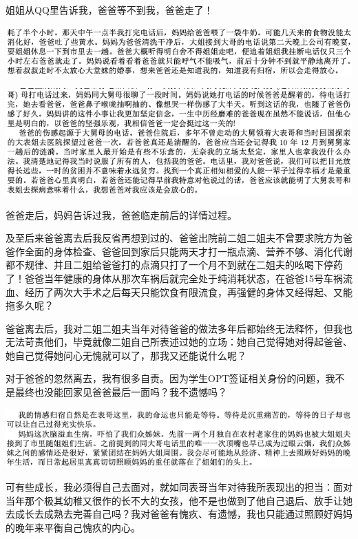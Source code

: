 \documentclass[9pt, b5paper]{article}
\begin{document}
姐姐从QQ里告诉我，爸爸等不到我，爸爸走了！

\begin{center}
\includegraphics[width=.9\linewidth]{./pic/backups_plans_20210415_103141.png}
\end{center}

\begin{center}
\includegraphics[width=.9\linewidth]{./pic/backups_plans_20210415_131810.png}
\end{center}

爸爸走后，妈妈告诉过我，爸爸临走前后的详情过程。

及至后来爸爸离去后我反省再想到过的、爸爸出院前二姐二姐夫不曾要求院方为爸爸作全面的身体检查、爸爸回到家后只能两天才打一瓶点滴、营养不够、消化代谢都不规律、并且二姐给爸爸打的点滴只打了一个月不到就在二姐夫的吆喝下停药了！爸爸当年健康的身体从那次车祸后就完全处于纯消耗状态，在爸爸15号车祸流血、经历了两次大手术之后每天只能饮食有限流食，再强健的身体又经得起、又能拖多久呢？

爸爸离去后，我对二姐二姐夫当年对待爸爸的做法多年后都始终无法释怀，但我也无法苛责他们，毕竟就像二姐自己所表述过她的立场：她自己觉得她对得起爸爸、她自己觉得她问心无愧就可以了，那我又还能说什么呢？

对于爸爸的忽然离去，我有很多自责。因为学生OPT签证相关身份的问题，我不是最终也没能回家见爸爸最后一面吗？我不遗憾吗？

\begin{center}
\includegraphics[width=.9\linewidth]{./pic/backups_plans_20210417_120117.png}
\end{center}

可有些成长，我必须得自己去面对，就如同表哥当年对待我所表现出的担当：面对当年那个极其幼稚又很作的长不大的女孩，他不是也做到了他自己退后、放手让她去成长去成熟去完善自己吗？我对爸爸有愧疚、有遗憾，我也只能通过照顾好妈妈的晚年来平衡自己愧疚的内心。
\end{document}
